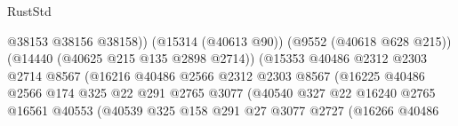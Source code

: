 \begin{lexlean}{RustStd}
\begin{coremodule}
                                                    @38153
                                                    @38156
                                                    @38158))
                                                (@15314 (@40613 @90))
                                                (@9552 (@40618 @628 @215))
                                                (@14440 (@40625 @215 @135 @2898 @2714))
                                                (@15353
                                                  @40486
                                                  @2312
                                                  @2303
                                                  @2714
                                                  @8567
                                                  (@16216
                                                    @40486
                                                    @2566
                                                    @2312
                                                    @2303
                                                    @8567
                                                    (@16225
                                                      @40486
                                                      @2566
                                                      @174
                                                      @325
                                                      @22
                                                      @291
                                                      @2765
                                                      @3077
                                                      (@40540
                                                        @327
                                                        @22
                                                        @16240
                                                        @2765
                                                        @16561
                                                        @40553
                                                        (@40539
                                                          @325
                                                          @158
                                                          @291
                                                          @27
                                                          @3077
                                                          @2727
                                                          (@16266
                                                            @40486

\end{coremodule}
\end{lexlean}
